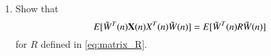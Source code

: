 \documentclass[journal,12pt,twocolumn]{IEEEtran}
\renewcommand\thesection{\arabic{section}}
\renewcommand\thesubsection{\thesection.\arabic{subsection}}
\begin{document}
\begin{enumerate}[label=\thesubsection.\arabic*
,ref=\thesubsection.\theenumi]


\item
Show that 
\begin{equation}
E[\tilde W^{T}(n)\mathbf{X}(n) X^{T}(n) \tilde W(n)] = E[\tilde W^{T}(n) R \tilde W(n)]
\end{equation}
%
for $R$ defined in \eqref{eq:matrix_R}.



\end{enumerate}
\end{document}
